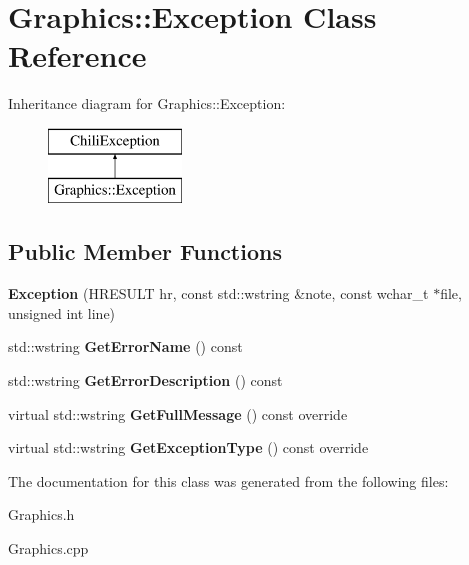 \hypertarget{class_graphics_1_1_exception}{}\section{Graphics\+:\+:Exception Class Reference}
\label{class_graphics_1_1_exception}
Inheritance diagram for Graphics\+:\+:Exception\+:\begin{figure}[H]
\begin{center}
\leavevmode
\includegraphics[height=2.000000cm]{class_graphics_1_1_exception}
\end{center}
\end{figure}
\subsection*{Public Member Functions}
\begin{DoxyCompactItemize}
\item 
\mbox{\label{class_graphics_1_1_exception_a4b41b1546bc1cfed820ce788bb92be66}} 
{\bfseries Exception} (H\+R\+E\+S\+U\+LT hr, const std\+::wstring \&note, const wchar\+\_\+t $\ast$file, unsigned int line)
\item 
\mbox{\label{class_graphics_1_1_exception_ac17beac957a2bd74fd7057c0854cec2b}} 
std\+::wstring {\bfseries Get\+Error\+Name} () const
\item 
\mbox{\label{class_graphics_1_1_exception_a5c772df700d65afebeede2458517b79d}} 
std\+::wstring {\bfseries Get\+Error\+Description} () const
\item 
\mbox{\label{class_graphics_1_1_exception_a72385eeb123d5171055c501c52833563}} 
virtual std\+::wstring {\bfseries Get\+Full\+Message} () const override
\item 
\mbox{\label{class_graphics_1_1_exception_ac8b78d9f50a178dc70407079a6958602}} 
virtual std\+::wstring {\bfseries Get\+Exception\+Type} () const override
\end{DoxyCompactItemize}


The documentation for this class was generated from the following files\+:\begin{DoxyCompactItemize}
\item 
Graphics.\+h\item 
Graphics.\+cpp\end{DoxyCompactItemize}
